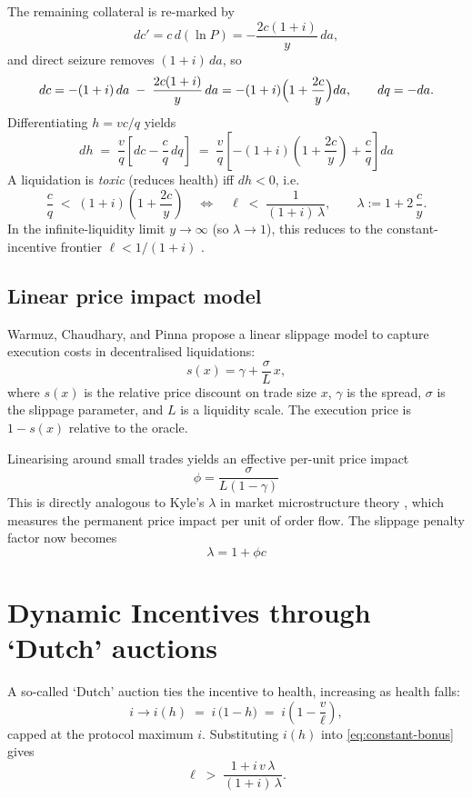 \documentclass[11pt]{article}
\begin{document}
The remaining collateral is re-marked by
\[
dc' = c\,d(\ln P) = -\frac{2c(1+i)}{y}\,da,
\]
and direct seizure removes \((1+i)\,da\), so
\[
dc = - (1+i)\,da \;-\; \frac{2c(1+i)}{y}\,da
= -(1+i)\Bigl(1+\frac{2c}{y}\Bigr)da,
\qquad dq=-da.
\]
Differentiating \(h = v c/q\) yields
\[
dh \;=\; \frac{v}{q}\!\left[dc - \frac{c}{q}\,dq\right]
\;=\; \frac{v}{q}\!\left[-(1+i)\!\left(1+\frac{2c}{y}\right) + \frac{c}{q}\right]\!da
\]
A liquidation is \emph{toxic} (reduces health) iff \(dh<0\), i.e.
\begin{equation}
\frac{c}{q} \;<\; (1+i)\!\left(1+\frac{2c}{y}\right)
\quad\Longleftrightarrow\quad
\ell \;<\; \frac{1}{(1+i)\,\lambda},
\qquad
\lambda := 1 + 2\,\frac{c}{y}.
\label{eq:constant-bonus}
\end{equation}
In the infinite-liquidity limit \(y\to\infty\) (so \(\lambda\to 1\)), this reduces to the constant-incentive frontier \(\ell < 1/(1+i)\) \cite{WCP2022}.

\subsection{Linear price impact model}
Warmuz, Chaudhary, and Pinna \cite{WCP2022} propose a linear slippage model to capture execution costs in decentralised liquidations:
\[
s(x) = \gamma + \frac{\sigma}{L}\,x,
\]
where $s(x)$ is the relative price discount on trade size $x$, $\gamma$ is the spread, $\sigma$ is the slippage parameter, and $L$ is a liquidity scale. The execution price is $1-s(x)$ relative to the oracle.

Linearising around small trades yields an effective per-unit price impact
\[
\phi = \frac{\sigma}{L(1-\gamma)}
\]
This is directly analogous to Kyle’s $\lambda$ in market microstructure theory \cite{Kyle1985}, which measures the permanent price impact per unit of order flow. The slippage penalty factor now becomes
\[
\lambda = 1 + \phi c
\]

\section{Dynamic Incentives through `Dutch' auctions}
A so-called `Dutch' auction ties the incentive to health, increasing as health falls:
\[
i \to i(h) \;=\; i\,\bigl(1-h\bigr)
\;=\; i\!\left(1 - \frac{v}{\ell}\right),
\]
capped at the protocol maximum \(i\). Substituting \(i(h)\) into \eqref{eq:constant-bonus} gives
\begin{equation}
\ell \;>\; \frac{1 + i\,v\,\lambda}{(1+i)\,\lambda}.
\label{eq:euler-dutch}
\end{equation}
\end{document}
